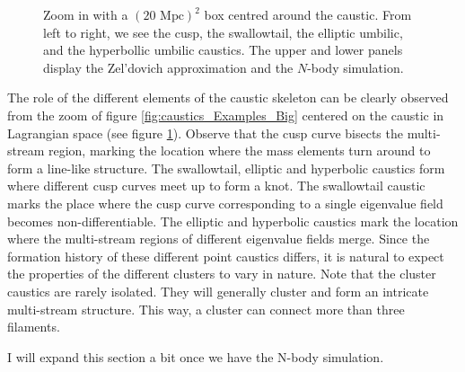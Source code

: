 \documentclass[a4paper, 11pt]{article}
\begin{document}
\begin{figure}
\begin{subfigure}[b]{0.24\textwidth}
\end{subfigure}
\caption{Zoom in with a $(20 \text{ Mpc})^2$ box centred around the caustic. From left to right, we see the cusp, the swallowtail, the elliptic umbilic, and the hyperbollic umbilic caustics. The upper and lower panels display the Zel'dovich approximation and the $N$-body simulation.}\label{fig:caustics_Examples_Small}
\end{figure}

The role of the different elements of the caustic skeleton can be clearly observed from the zoom of figure \ref{fig:caustics_Examples_Big} centered on the caustic in Lagrangian space (see figure \ref{fig:caustics_Examples_Small}). Observe that the cusp curve bisects the multi-stream region, marking the location where the mass elements turn around to form a line-like structure. The swallowtail, elliptic and hyperbolic caustics form where different cusp curves meet up to form a knot. The swallowtail caustic marks the place where the cusp curve corresponding to a single eigenvalue field becomes non-differentiable. The elliptic and hyperbolic caustics mark the location where the multi-stream regions of different eigenvalue fields merge. Since the formation history of these different point caustics differs, it is natural to expect the properties of the different clusters to vary in nature. Note that the cluster caustics are rarely isolated. They will generally cluster and form an intricate multi-stream structure. This way, a cluster can connect more than three filaments.

\begin{framed}
{\color{red} I will expand this section a bit once we have the N-body simulation.}
\end{framed}





\end{document}
